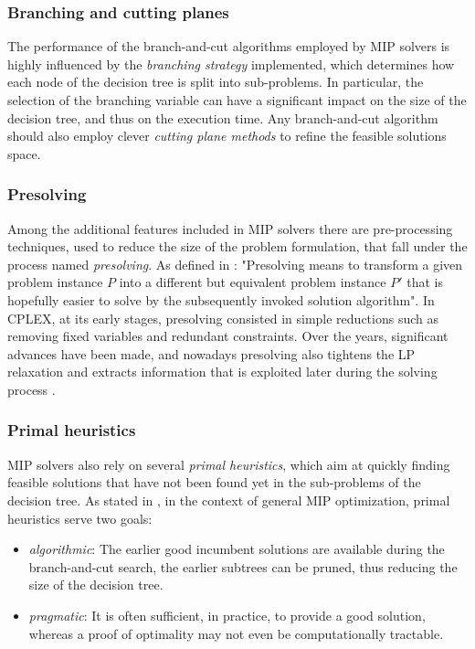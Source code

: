 \subsubsection{Branching and cutting planes}
The performance of the branch-and-cut algorithms employed by MIP solvers is highly influenced by the \textit{branching strategy} implemented, which determines how each node of the decision tree is split into sub-problems. In particular, the selection of the branching variable can have a significant impact on the size of the decision tree, and thus on the execution time.
Any branch-and-cut algorithm should also employ clever \textit{cutting plane methods} to refine the feasible solutions space. \par 

\subsubsection{Presolving}
Among the additional features included in MIP solvers there are pre-processing techniques, used to reduce the size of the problem formulation, that fall under the process named \textit{presolving}.
As defined in \cite{achterberg2013}:
	"Presolving means to transform a given problem instance $P$ into a
	different but equivalent problem instance $P'$ that is hopefully easier to solve by the subsequently invoked solution algorithm".
In CPLEX, at its early stages, presolving consisted in simple reductions such as removing fixed variables and redundant constraints. Over the years, significant advances have been made, and nowadays presolving also tightens the LP relaxation and extracts information that is exploited later during the solving process \cite{achterberg2013}. \par 

\subsubsection{Primal heuristics}
MIP solvers also rely on several \textit{primal heuristics}, which aim at quickly finding feasible solutions that have not been found yet in the sub-problems of the decision tree.
As stated in \cite{achterberg2013}, in the context of general MIP optimization, primal heuristics serve two goals:
\begin{itemize}
	\item \textit{algorithmic}: The earlier good incumbent solutions are available during the branch-and-cut search, the earlier subtrees can be pruned, thus reducing the size of the decision tree.
	\item \textit{pragmatic}: It is often sufficient, in practice, to provide a good solution, whereas a proof of optimality may not even be computationally tractable.
\end{itemize}